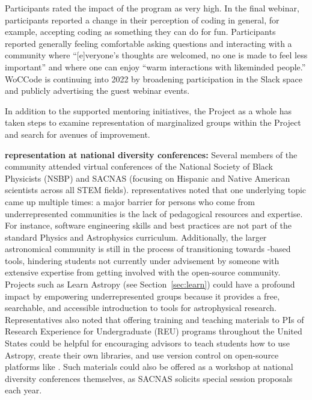 \documentclass[modern]{aastex631}
\begin{document}
Participants rated the impact of the program as very high. In the
final webinar, participants reported a change in their perception of
coding in general, for example, accepting coding as something they can
do for fun. Participants reported generally feeling comfortable asking
questions and interacting with a community where ``[e]veryone's
thoughts are welcomed, no one is made to feel less important'' and
where one can enjoy ``warm interactions with likeminded people.''
WoCCode is continuing into 2022 by broadening participation in the
Slack space and publicly advertising the guest webinar events.

In addition to the supported mentoring initiatives, the \astropy
Project as a whole has taken steps to examine representation of
marginalized groups within the Project and search for avenues of
improvement.

\textbf{\astropy representation at national diversity conferences:}
Several members of the \astropy community attended virtual conferences of the
National Society of Black Physicists (NSBP) and SACNAS (focusing on Hispanic and
Native American scientists across all STEM fields). \astropy representatives
noted that one underlying topic came up multiple times: a major barrier for
persons who come from underrepresented communities is the lack of pedagogical
resources and expertise. For instance, software engineering skills and best
practices are not part of the standard
Physics and Astrophysics curriculum. Additionally, the larger astronomical
community is still in the process of transitioning towards \python-based tools,
hindering students not currently under advisement by someone with
extensive \python expertise from getting involved with the open-source \python
community. Projects such as Learn Astropy (see Section~\ref{sec:learn}) could
have a profound impact by empowering underrepresented groups because it provides
a free, searchable, and accessible introduction to \python tools for
astrophysical research. Representatives also noted that offering training and
teaching materials to PIs of Research Experience for Undergraduate (REU)
programs throughout the United States could be helpful for encouraging advisors
to teach students how to use Astropy, create their own libraries, and use
version control on open-source platforms like \github. Such materials could also
be offered as a workshop at national diversity conferences themselves, as SACNAS
solicits special session proposals each year.
\end{document}
